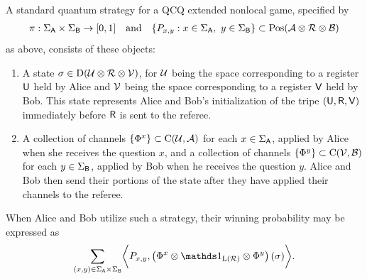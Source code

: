 A standard quantum strategy for a QCQ extended nonlocal game, specified by 
\begin{align}
	\pi : \Sigma_{\mathsf{A}} \times \Sigma_{\mathsf{B}} \rightarrow [0,1] \quad \textnormal{and} \quad \{P_{x,y} : x \in \Sigma_{\mathsf{A}}, \ y \in \Sigma_{\mathsf{B}} \} \subset \mathrm{Pos}(\mathcal{A} \otimes \mathcal{R} \otimes \mathcal{B})
\end{align}
as above, consists of these objects: 

\begin{enumerate}
	\item A state $\sigma \in \mathrm{D}(\mathcal{U} \otimes \mathcal{R} \otimes \mathcal{V})$, for $\mathcal{U}$ being the space corresponding to a register $\mathsf{U}$ held by Alice and $\mathcal{V}$ being the space corresponding to a register $\mathsf{V}$ held by Bob. This state represents Alice and Bob's initialization of the tripe $(\mathsf{U},\mathsf{R},\mathsf{V})$ immediately before $\mathsf{R}$ is sent to the referee. 
	\item A collection of channels $\{ \Phi^x \} \subset \mathrm{C}(\mathcal{U},\mathcal{A})$ for each $x \in \Sigma_{\mathsf{A}}$, applied by Alice when she receives the question $x$, and a collection of channels $\{\Phi^y \} \subset \mathrm{C}(\mathcal{V},\mathcal{B})$ for each $y \in \Sigma_{\mathsf{B}}$, applied by Bob when he receives the question $y$. Alice and Bob then send their portions of the state after they have applied their channels to the referee. 
\end{enumerate} 
When Alice and Bob utilize such a strategy, their winning probability may be expressed as 
\begin{align}
	  \sum_{\substack{
      (x,y) \in \SigmaA \times \SigmaB 
  }}
	\biggip{P_{x,y}}{ \left( \Phi^x \otimes \I_{\Lin(\R)} \otimes \Phi^y \right) \left(\sigma\right) }.
\end{align}
